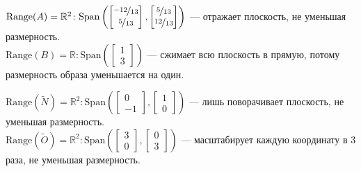 \documentclass[a3paper,14pt]{extarticle}
\begin{document}
\begin{center}
    $\text{Range}(A) = \mathbb{R}^2\colon \text{Span}\left(\begin{bmatrix}
        \nicefrac{-12}{13} \\ \nicefrac{5}{13}
    \end{bmatrix}, \begin{bmatrix}
        \nicefrac{5}{13} \\ \nicefrac{12}{13}
    \end{bmatrix}\right)$ --- отражает плоскость, не уменьшая размерность. \\[0.5em]
    $\text{Range}(B) = \mathbb{R}\colon \text{Span}\left(\begin{bmatrix}
        1 \\ 3
    \end{bmatrix}\right)$ --- сжимает всю плоскость в прямую, потому размерность образа уменьшается на один.
\end{center}\pagebreak\begin{center}
    $\text{Range}(\tilde{N}) = \mathbb{R}^2\colon \text{Span}\left(\begin{bmatrix}
        0 \\ -1
    \end{bmatrix}, \begin{bmatrix}
        1 \\ 0
    \end{bmatrix}\right)$ --- лишь поворачивает плоскость, не уменьшая размерность. \\[0.5em]
    $\text{Range}(\tilde{O}) = \mathbb{R}^2\colon \text{Span}\left(\begin{bmatrix}
        3 \\ 0
    \end{bmatrix}, \begin{bmatrix}
        0 \\ 3
    \end{bmatrix}\right)$ --- масштабирует каждую координату в 3 раза, не уменьшая размерность.
\end{center}
\end{document}
